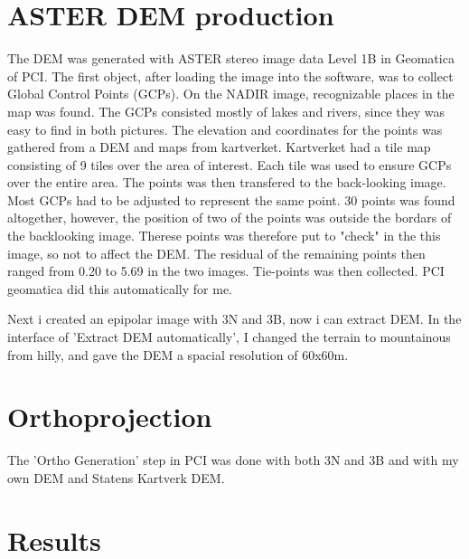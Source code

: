 \documentclass[a4paper,UKenglish]{article}
\begin{document}
\section{ASTER DEM production}

The DEM was generated with ASTER stereo image data Level 1B in Geomatica of PCI. The first object, after loading the image into the software, was to collect Global Control Points (GCPs). On the NADIR image, recognizable places in the map was found. The GCPs consisted mostly of lakes and rivers, since they was easy to find in both pictures. The elevation and coordinates for the points was gathered from a DEM and maps from kartverket. Kartverket had a tile map consisting of 9 tiles over the area of interest. Each tile was used to ensure GCPs over the entire area. The points was then transfered to the back-looking image. Most GCPs had to be adjusted to represent the same point. 30 points was found altogether, however, the position of two of the points was outside the bordars of the backlooking image. Therese points was therefore put to "check" in the this image, so not to affect the DEM. The residual of the remaining points then ranged from 0.20 to 5.69 in the two images. Tie-points was then collected. PCI geomatica did this automatically for me.

Next i created an epipolar image with 3N and 3B, now i can extract DEM. In the interface of 'Extract DEM automatically', I changed the terrain to mountainous from hilly, and gave the DEM a spacial resolution of 60x60m.

\section{Orthoprojection}

The 'Ortho Generation' step in PCI was done with both 3N and 3B and with my own DEM and Statens Kartverk DEM.

\section{Results}
\end{document}
